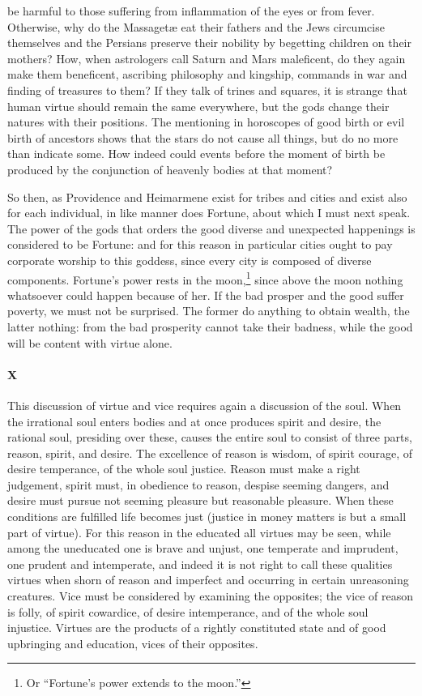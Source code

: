 \documentclass[12pt]{article}
\begin{document}
be harmful to those suffering from inflammation of the eyes or from fever.
Otherwise, why do the Massaget{\ae} eat their fathers and the Jews circumcise
themselves and the Persians preserve their nobility by begetting children on
their mothers? How, when astrologers call Saturn and Mars maleficent, do they
again make them beneficent, ascribing philosophy and kingship, commands in war
and finding of treasures to them? If they talk of trines and squares, it is
strange that human virtue should remain the same everywhere, but the gods
change their natures with their positions. The mentioning in horoscopes of good
birth or evil birth of ancestors shows that the stars do not cause all things,
but do no more than indicate some. How indeed could events before the moment of
birth be produced by the conjunction of heavenly bodies at that moment?

So then, as Providence and Heimarmene exist for tribes and cities and exist
also for each individual, in like manner does Fortune, about which I must next
speak. The power of the gods that orders the good diverse and unexpected
happenings is considered to be Fortune: and for this reason in particular
cities ought to pay corporate worship to this goddess, since every city is
composed of diverse components. Fortune's power rests in the moon,\footnote{Or
``Fortune's power extends to the moon.''} since above the moon nothing
whatsoever could happen because of her. If the bad prosper and the good suffer
poverty, we must not be surprised. The former do anything to obtain wealth, the
latter nothing: from the bad prosperity cannot take their badness, while the
good will be content with virtue alone.

\paragraph{X} This discussion of virtue and vice requires again a discussion of
the soul. When the irrational soul enters bodies and at once produces spirit
and desire, the rational soul, presiding over these, causes the entire soul to
consist of three parts, reason, spirit, and desire. The excellence of reason is
wisdom, of spirit courage, of desire temperance, of the whole soul justice.
Reason must make a right judgement, spirit must, in obedience to reason,
despise seeming dangers, and desire must pursue not seeming pleasure but
reasonable pleasure. When these conditions are fulfilled life becomes just
(justice in money matters is but a small part of virtue). For this reason in
the educated all virtues may be seen, while among the uneducated one is brave
and unjust, one temperate and imprudent, one prudent and intemperate, and
indeed it is not right to call these qualities virtues when shorn of reason and
imperfect and occurring in certain unreasoning creatures. Vice must be
considered by examining the opposites; the vice of reason is folly, of spirit
cowardice, of desire intemperance, and of the whole soul injustice. Virtues
are the products of a rightly constituted state and of good upbringing and
education, vices of their opposites.
\end{document}
